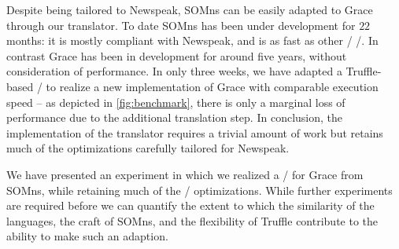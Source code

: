 Despite being tailored to Newspeak, SOMns can be easily adapted to Grace through our translator. To date SOMns has been under development for $22$ months: it is mostly compliant with Newspeak, and is as fast as other \JITing/ \VMs/. In contrast Grace has been in development for around five years, without consideration of performance. In only three weeks, we have adapted a Truffle-based \VM/ to realize a new implementation of Grace with comparable execution speed -- as depicted in \autoref{fig:benchmark}, there is only a marginal loss of performance due to the additional translation step. In conclusion, the implementation of the translator requires a trivial amount of work but retains much of the optimizations carefully tailored for Newspeak.

We have presented an experiment in which we realized a \VM/ for Grace from SOMns, while retaining much of the \AST/ optimizations. While further experiments are required before we can quantify the extent to which the similarity of the languages, the craft of SOMns, and the flexibility of Truffle contribute to the ability to make such an adaption. 

